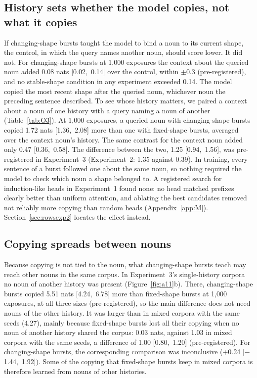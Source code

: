 \documentclass[11pt]{article}
\begin{document}
\subsection{History sets whether the model copies, not what it copies}
If changing-shape bursts taught the model to bind a noun to its current shape, the control, in which the query names another noun, should score lower. It did not. For changing-shape bursts at 1,000 exposures the context about the queried noun added 0.08 nats [0.02,~0.14] over the control, within $\pm$0.3 (pre-registered), and no stable-shape condition in any experiment exceeded 0.14. The model copied the most recent shape after the queried noun, whichever noun the preceding sentence described. To see whose history matters, we paired a context about a noun of one history with a query naming a noun of another (Table~\ref{tab:O3}). At 1,000 exposures, a queried noun with changing-shape bursts copied 1.72 nats [1.36,~2.08] more than one with fixed-shape bursts, averaged over the context noun's history. The same contrast for the context noun added only 0.47 [0.36,~0.58]. The difference between the two, 1.25 [0.94,~1.56], was pre-registered in Experiment~3 (Experiment~2: 1.35 against 0.39). In training, every sentence of a burst followed one about the same noun, so nothing required the model to check which noun a shape belonged to. A registered search for induction-like heads \citep{olsson2022} in Experiment~1 found none: no head matched prefixes clearly better than uniform attention, and ablating the best candidates removed not reliably more copying than random heads (Appendix~\ref{app:M}). Section~\ref{sec:rowsexp2} locates the effect instead.

\subsection{Copying spreads between nouns}\label{sec:single}
Because copying is not tied to the noun, what changing-shape bursts teach may reach other nouns in the same corpus. In Experiment~3's single-history corpora no noun of another history was present (Figure~\ref{fig:a11}b). There, changing-shape bursts copied 5.51 nats [4.24,~6.78] more than fixed-shape bursts at 1,000 exposures, at all three sizes (pre-registered), so the main difference does not need nouns of the other history. It was larger than in mixed corpora with the same seeds (4.27), mainly because fixed-shape bursts lost all their copying when no noun of another history shared the corpus: 0.03 nats, against 1.03 in mixed corpora with the same seeds, a difference of 1.00 [0.80,~1.20] (pre-registered). For changing-shape bursts, the corresponding comparison was inconclusive (+0.24 [$-$1.44,~1.92]). Some of the copying that fixed-shape bursts keep in mixed corpora is therefore learned from nouns of other histories.
\end{document}
